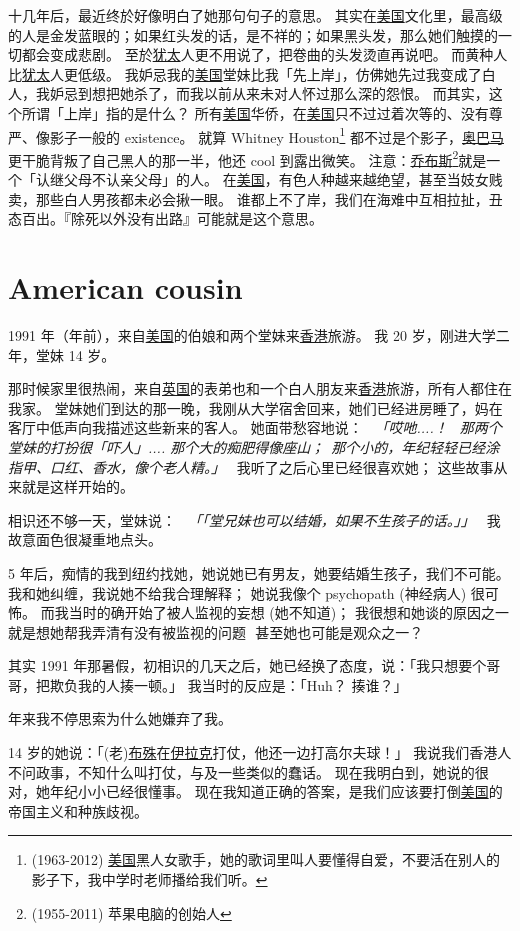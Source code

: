 \documentclass[12pt]{report}
\newcommand{\speechCn}[1]{\textit{\textcolor{Speech}{\ 「#1」\ }}}
\newcommand*\dashh{\textemdash\,\,}
\begin{document}
十几年后，最近终於好像明白了她那句句子的意思。 其实在\uline{美国}文化里，最高级的人是金发蓝眼的；如果红头发的话，是不祥的；如果黑头发，那么她们触摸的一切都会变成悲剧。 至於\uline{犹太}人更不用说了，把卷曲的头发烫直再说吧。 而黄种人比\uline{犹太}人更低级。 我妒忌我的\uline{美国}堂妹比我「先上岸」，仿佛她先过我变成了白人，我妒忌到想把她杀了，而我以前从来未对人怀过那么深的怨恨。 而其实，这个所谓「上岸」指的是什么？ 所有\uline{美国}华侨，在\uline{美国}只不过过着次等的、没有尊严、像影子一般的 existence。 就算 Whitney Houston\footnote{(1963-2012) \uline{美国}黑人女歌手，她的歌词里叫人要懂得自爱，不要活在别人的影子下，我中学时老师播给我们听。} 都不过是个影子，\uline{奥巴马}更干脆背叛了自己黑人的那一半，他还 cool 到露出微笑。  注意：\uline{乔布斯}\footnote{(1955-2011) 苹果电脑的创始人}就是一个「认继父母不认亲父母」的人。 在\uline{美国}，有色人种越来越绝望，甚至当妓女贱卖，那些白人男孩都未必会揪一眼。 谁都上不了岸，我们在海难中互相拉扯，丑态百出。『除死以外没有出路』可能就是这个意思。

\chapter{American cousin}

1991 年（\resultb 年前），来自\uline{美国}的伯娘和两个堂妹来\uline{香港}旅游。 我 20 岁，刚进大学二年，堂妹 14 岁。

那时候家里很热闹，来自\uline{英国}的表弟也和一个白人朋友来\uline{香港}旅游，所有人都住在我家。  堂妹她们到达的那一晚，我刚从大学宿舍回来，她们已经进房睡了，妈在客厅中低声向我描述这些新来的客人。    她面带愁容地说： \speechCn{哎吔....！ \ 那两个堂妹的打扮很「吓人」.... 那个大的痴肥得像座山；\  那个小的，年纪轻轻已经涂指甲、口红、香水，像个老人精。}   我听了之后心里已经很喜欢她； 这些故事从来就是这样开始的。

相识还不够一天，堂妹说： \speechCn{「堂兄妹也可以结婚，如果不生孩子的话。」} 我故意面色很凝重地点头。

5 年后，痴情的我到纽约找她，她说她已有男友，她要结婚生孩子，我们不可能。 我和她纠缠，我说她不给我合理解释； 她说我像个 psychopath (神经病人) 很可怖。 而我当时的确开始了被人监视的妄想 (她不知道)； 我很想和她谈的原因之一就是想她帮我弄清有没有被监视的问题 \dashh 甚至她也可能是观众之一？

其实 1991 年那暑假，初相识的几天之后，她已经换了态度，说：「我只想要个哥哥，把欺负我的人揍一顿。」 我当时的反应是：「Huh？ 揍谁？」

\resultb 年来我不停思索为什么她嫌弃了我。

14 岁的她说：「(老)\uline{布殊}在\uline{伊拉克}打仗，他还一边打高尔夫球！」 我说我们香港人不问政事，不知什么叫打仗，与及一些类似的蠢话。  现在我明白到，她说的很对，她年纪小小已经很懂事。  现在我知道正确的答案，是我们应该要打倒\uline{美国}的帝国主义和种族歧视。
\end{document}
